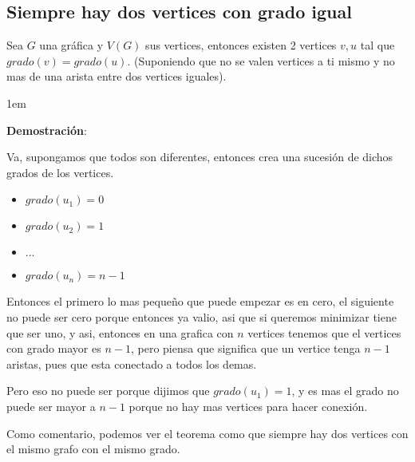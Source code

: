 \documentclass[12pt, fleqn]{report}                             %
\newenvironment{SmallIndentation}[1][0.75em]                    %
        {\begin{adjustwidth}{#1}{}\begin{footnotesize}}             %
        {\end{footnotesize}\end{adjustwidth}}                       %
\theoremstyle{break}                                            %
\begin{document}
            \subsection{Siempre hay dos vertices con grado igual}

                Sea $G$ una gráfica y $V(G)$ sus vertices, entonces existen 2 vertices $v, u$
                tal que $grado(v) = grado(u)$. (Suponiendo que no se valen vertices a ti mismo y no mas de una
                arista entre dos vertices iguales).

                    \begin{SmallIndentation}[1em]
                        \textbf{Demostración}:

                        Va, supongamos que todos son diferentes, entonces crea una sucesión de dichos grados de los
                        vertices.
                        \begin{itemize}
                            \item  $grado(u_1) = 0$
                            \item  $grado(u_2) = 1$
                            \item  $\dots$
                            \item  $grado(u_n) = n - 1$
                        \end{itemize}

                        Entonces el primero lo mas pequeño que puede empezar es en cero, el siguiente
                        no puede ser cero porque entonces ya valio, asi que si queremos minimizar tiene que ser
                        uno, y asi, entonces en una grafica con $n$ vertices tenemos que el vertices con grado 
                        mayor es $n - 1$, pero piensa que significa que un vertice tenga $n - 1$ aristas, pues
                        que esta conectado a todos los demas.

                        Pero eso no puede ser porque dijimos que $grado(u_1) = 1$, y es mas el grado no puede ser
                        mayor a $n - 1$ porque no hay mas vertices para hacer conexión.


                    \end{SmallIndentation}

                Como comentario, podemos ver el teorema como que siempre hay dos vertices con el mismo grafo
                con el mismo grado.
\end{document}
